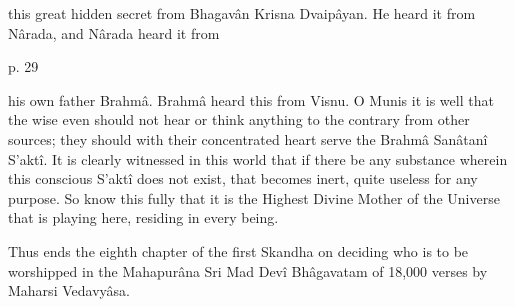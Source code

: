 this great hidden secret from Bhagavân Krisna Dvaipâyan. He heard it from Nârada, and Nârada heard it from

 

p. 29

 

his own father Brahmâ. Brahmâ heard this from Visnu. O Munis it is well that the wise even should not hear or think anything to the contrary from other sources; they should with their concentrated heart serve the Brahmâ Sanâtanî S’aktî. It is clearly witnessed in this world that if there be any substance wherein this conscious S’aktî does not exist, that becomes inert, quite useless for any purpose. So know this fully that it is the Highest Divine Mother of the Universe that is playing here, residing in every being.

 

Thus ends the eighth chapter of the first Skandha on deciding who is to be worshipped in the Mahapurâna Sri Mad Devî Bhâgavatam of 18,000 verses by Maharsi Vedavyâsa.